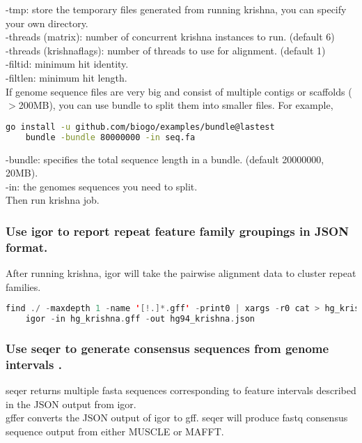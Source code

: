 \documentclass[a4paper,12pt]{article}
\begin{document}
	\noindent -tmp: store the temporary files generated from running krishna, you can specify your own directory. \\
	-threads (matrix): number of concurrent krishna instances to run. (default 6) \\
	-threads (krishnaflags): number of threads to use for alignment. (default 1) \\
	-filtid: minimum hit identity. \\
	-filtlen: minimum hit length. \\
	
	\noindent If genome sequence files are very big and consist of multiple contigs or scaffolds ($>$200MB), you can use bundle to split them into smaller files. For example,
	
	\begin{lstlisting}[language=bash]
	go install -u github.com/biogo/examples/bundle@lastest
	bundle -bundle 80000000 -in seq.fa \end{lstlisting}
	
	\noindent -bundle: specifies the total sequence length in a bundle. (default 20000000, 20MB).\\
	-in: the genomes sequences you need to split.\\
	Then run krishna job.\\
	
	\subsubsection{Use igor to report repeat feature family groupings in JSON format.}
	
	After running krishna, igor will take the pairwise alignment data to cluster repeat families.
	\begin{lstlisting}[language=scala]
	find ./ -maxdepth 1 -name '[!.]*.gff' -print0 | xargs -r0 cat > hg_krishna.gff
	igor -in hg_krishna.gff -out hg94_krishna.json \end{lstlisting}
	
	\subsubsection{Use seqer to generate consensus sequences from genome intervals .}
	seqer returns multiple fasta sequences corresponding to feature intervals described in the JSON output from igor. \\
	
	\noindent gffer converts the JSON output of igor to gff. seqer will produce fastq consensus sequence output from either MUSCLE or MAFFT. 
	
\end{document}
